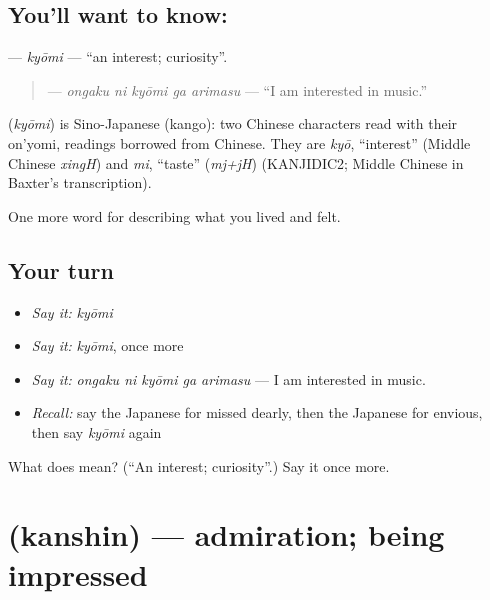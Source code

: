 \subsection*{You'll want to know: }
\textbf{} — \emph{kyōmi} — \textquotedblleft{}an interest; curiosity\textquotedblright{}.

\begin{quote}
\textbf{  } — \emph{ongaku ni kyōmi ga arimasu} — \textquotedblleft{}I am interested in music.\textquotedblright{}
\end{quote}

\begin{cousinweb}
\textbf{} (\emph{kyōmi}) is Sino-Japanese (kango): two Chinese characters read with their on'yomi, readings borrowed from Chinese. They are \emph{kyō}, \textquotedblleft{}interest\textquotedblright{} (Middle Chinese \emph{xingH}) and \emph{mi}, \textquotedblleft{}taste\textquotedblright{} (\emph{mj+jH}) (KANJIDIC2; Middle Chinese in Baxter's transcription).
\end{cousinweb}

\begin{grammarlens}[title={What you've built}]
One more word for describing what you lived and felt.
\end{grammarlens}

\subsection*{Your turn}
\begin{itemize}
\raggedright
  \item \emph{Say it:} \emph{kyōmi}
  \item \emph{Say it:} \emph{kyōmi}, once more
  \item \emph{Say it:} \emph{ongaku ni kyōmi ga arimasu} — I am interested in music.
  \item \emph{Recall:} say the Japanese for missed dearly, then the Japanese for envious, then say \emph{kyōmi} again
\end{itemize}

\begin{tcolorbox}[breakable,colback=teal!4,colframe=teal!35!black,title={Before you move on}]
What does  mean? (\textquotedblleft{}An interest; curiosity\textquotedblright{}.) Say it once more.
\end{tcolorbox}
\section[\texorpdfstring{\ja{かんしん} (kanshin)}{かんしん (kanshin)}]{ (kanshin) — admiration; being impressed}

